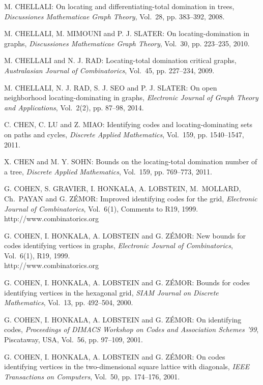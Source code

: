 \begin{thebibliography}{999}
M. CHELLALI: On locating and differentiating-total domination in trees, {\it Discussiones Mathematicae Graph Theory}, Vol.~28, pp. 383--392, 2008.

M. CHELLALI, M. MIMOUNI and P. J. SLATER: On locating-domination in graphs, {\it
Discussiones Mathematicae Graph Theory}, Vol.~30, pp. 223--235, 2010.

M. CHELLALI and N. J. RAD: Locating-total domination critical graphs, {\it Australasian Journal of Combinatorics}, Vol.~45, pp. 227--234, 2009.

M. CHELLALI, N. J. RAD, S. J. SEO and P. J. SLATER: On open neighborhood locating-dominating in graphs, {\it Electronic Journal of Graph Theory and Applications}, Vol.~2(2), pp. 87--98, 2014.

C. CHEN, C. LU and Z. MIAO: Identifying codes and locating-dominating sets on paths and cycles, {\it Discrete Applied Mathematics}, Vol.~159, pp. 1540--1547, 2011.

X. CHEN and M. Y. SOHN: Bounds on the locating-total domination number of a tree, {\it Discrete Applied Mathematics}, Vol.~159, pp. 769--773, 2011.

G. COHEN, S. GRAVIER, I. HONKALA, A. LOBSTEIN, M.~MOLLARD, Ch.~PAYAN and G. Z\'EMOR: Improved identifying codes for the grid, {\it Electronic Journal of Combinatorics}, Vol.~6(1), Comments to R19, 1999.\\
http://www.combinatorics.org

%
G. COHEN, I. HONKALA, A. LOBSTEIN and G. Z\'EMOR: New bounds for codes identifying vertices in graphs, {\it Electronic Journal of Combinatorics}, Vol.~6(1), R19, 1999.\\
http://www.combinatorics.org

G. COHEN, I. HONKALA, A. LOBSTEIN and G. Z\'EMOR: Bounds for codes identifying vertices in the hexagonal grid, {\it SIAM Journal on Discrete Mathematics}, Vol.~13, pp. 492--504, 2000.

G. COHEN, I. HONKALA, A. LOBSTEIN and G. Z\'EMOR: On identifying codes, {\it Proceedings of DIMACS Workshop on Codes and Association Schemes '99}, Piscataway, USA, Vol.~56, pp. 97--109, 2001.

G. COHEN, I. HONKALA, A. LOBSTEIN and G. Z\'EMOR: On codes identifying vertices in the two-dimensional square lattice with diagonals, {\it IEEE Transactions on Computers}, Vol.~50, pp. 174--176, 2001.


\end{thebibliography}
